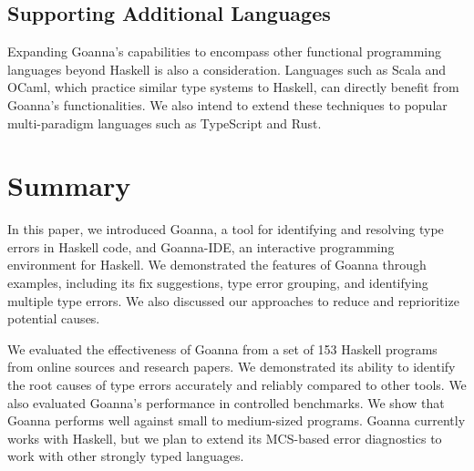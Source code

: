 \documentclass[pdflatex,lineno,sn-nature,Numbered]{sn-jnl}%
\begin{document}
\subsection{Supporting Additional Languages}

Expanding Goanna's capabilities to encompass other functional programming languages beyond Haskell is also a consideration. Languages such as Scala and OCaml, which practice similar type systems to Haskell, can directly benefit from Goanna's functionalities. We also intend to extend these techniques to popular multi-paradigm languages such as TypeScript and Rust.



\section{Summary} \label{sec:conclusion}

In this paper, we introduced Goanna, a tool for identifying and resolving type errors in Haskell code, and Goanna-IDE, an interactive programming environment for Haskell. We demonstrated the features of Goanna through examples, including its fix suggestions, type error grouping, and identifying multiple type errors. We also discussed our approaches to reduce and reprioritize potential causes.

We evaluated the effectiveness of Goanna from a set of 153 Haskell programs from online sources and research papers. We demonstrated its ability to identify the root causes of type errors accurately and reliably compared to other tools. We also evaluated Goanna's performance in controlled benchmarks. We show that Goanna performs well against small to medium-sized programs. Goanna currently works with Haskell, but we plan to extend its MCS-based error diagnostics to work with other strongly typed languages.



\end{document}
